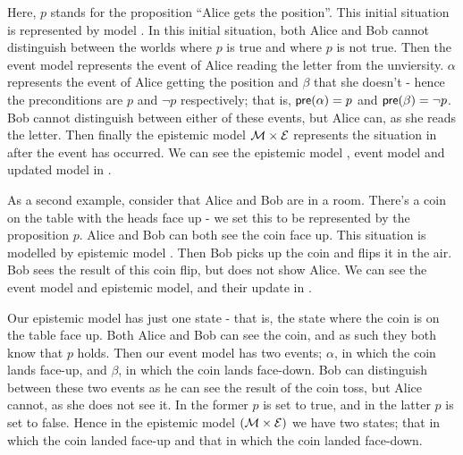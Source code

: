 \documentclass[10pt, a4paper]{report}
\begin{document}
Here, $p$ stands for the proposition ``Alice gets the position''. This initial
situation is represented by model . In this initial situation, both Alice
and Bob cannot distinguish between the worlds where $p$ is true and where $p$ is
not true. Then the event model  represents the event of Alice reading the letter
from the unviersity. $\alpha$ represents the event of Alice getting the position
and $\beta$ that she doesn't - hence the preconditions are $p$ and $\neg
p$ respectively; that is, $\textsf{pre}(\alpha) = p$ and $\textsf{pre}(\beta) = \neg p$. Bob
cannot distinguish between either of these events, but Alice can, as she reads
the letter. Then finally the epistemic model $\mathcal{M} \times \mathcal{E}$ represents the situation
in  after the event  has occurred. We can see the epistemic model ,
event model  and updated model  in .

As a second example, consider that Alice and Bob are in a room. There's a coin
on the table with the heads face up - we set this to be represented by the
proposition $p$. Alice and Bob can both see the coin face up. This situation is
modelled by epistemic model . Then Bob picks up the coin and flips it in
the air. Bob sees the result of this coin flip, but does not show Alice. We can
see the event model and epistemic model, and their update in
.

Our epistemic model has just one state - that is, the state where the coin is on
the table face up. Both Alice and Bob can see the coin, and as such they both
know that $p$ holds. Then our event model has two events; $\alpha$, in which the
coin lands face-up, and $\beta$, in which the coin lands face-down. Bob can
distinguish between these two events as he can see the result of the coin toss,
but Alice cannot, as she does not see it. In the former $p$ is set to true,
and in the latter $p$ is set to false. Hence in the epistemic model $(\mathcal{M}
\times \mathcal{E})$ we have two states; that in which the coin landed face-up and
that in which the coin landed face-down.
\end{document}
